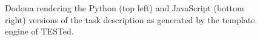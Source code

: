 \documentclass[../main]{subfiles}
\begin{document}
\begin{figure}
    \begin{wide}
    \end{wide}
    \caption{Dodona rendering the Python (top left) and JavaScript (bottom right) versions of the task description as generated by the template engine of TESTed.}
    \label{fig:dodona-render-task-description}
\end{figure}
\end{document}
